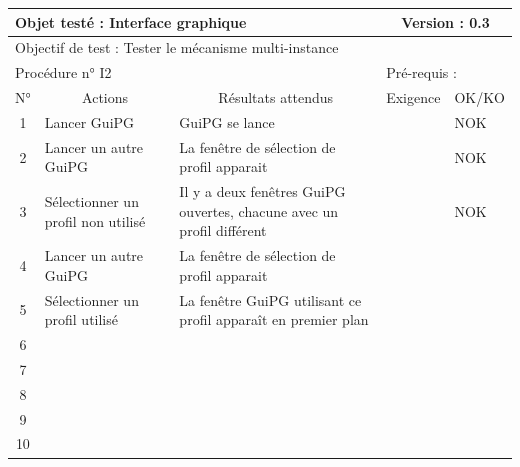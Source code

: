 \documentclass{../res/univ-projet}
\begin{document}
\begin{center}
    \begin{tabular}{|c|p{5cm}|p{5cm}|p{1.5cm}|p{1.5cm}|}
      \hline
      \multicolumn{3}{|l|}{Objet testé : Interface graphique} & \multicolumn{2}{c|}{Version : 0.3}\\ \hline
      \multicolumn{5}{|l|}{Objectif de test : Tester le mécanisme multi-instance}\\ \hline
      \multicolumn{3}{|l|}{Procédure n° I2} & \multicolumn{2}{p{3cm}|}{Pré-requis : }\\ \hline
      \multicolumn{1}{|c|}{N°} & \multicolumn{1}{c|}{Actions} & \multicolumn{1}{c|}{Résultats attendus} & 
      \multicolumn{1}{c|}{Exigence} & \multicolumn{1}{c|}{OK/KO}\\ \hline
      1 & Lancer GuiPG & GuiPG se lance &  & NOK \\
      2 & Lancer un autre GuiPG & La fenêtre de sélection de profil apparait &  & NOK \\
      3 & Sélectionner un profil non utilisé & Il y a deux fenêtres GuiPG ouvertes, chacune avec un profil différent &  & NOK \\ 
      4 & Lancer un autre GuiPG & La fenêtre de sélection de profil apparait &  & \\
      5 & Sélectionner un profil utilisé & La fenêtre GuiPG utilisant ce profil apparaît en premier plan &  & \\
      6 &  &  &  & \\
      7 &  &  &  & \\
      8 &  &  &  & \\
      9 &  &  &  & \\
      10 &  &  &  &\\ 
  \hline
    \end{tabular}
    \vskip 2.2cm



\end{center}
\end{document}

